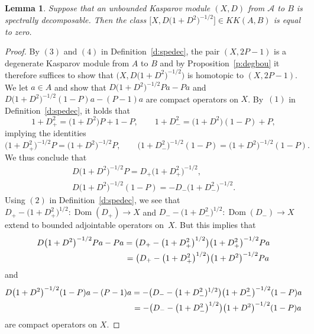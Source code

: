 \documentclass[11pt]{article}
\numberwithin{equation}{section}
\newtheorem{lem}[Theorem]{Lemma}
\newcommand{\s}[1]{\mathscr{#1}}
\begin{document}
\begin{lem}\label{l:spezer}
Suppose that an unbounded Kasparov module $(X,D)$ from $\s A$ to $B$ is spectrally decomposable. Then the class $\big[X,D\big(1 + D^2\big)^{-1/2}\big] \in KK(A,B)$ is equal to zero.
\end{lem}
\begin{proof}By $(3)$ and $(4)$ in Definition~\ref{d:spedec}, the pair $(X, 2 P - 1)$ is a degenerate Kasparov module from $A$ to $B$ and by Proposition~\ref{p:degbou} it therefore suffices to show that $\big(X,D\big(1 + D^2\big)^{-1/2}\big)$ is homotopic to $(X, 2P - 1)$. We let $a \in A$ and show that $D\big(1 + D^2\big)^{-1/2} P a - P a$ and $D\big(1 + D^2\big)^{-1/2}(1 - P) a - (P - 1) a$ are compact operators on $X$. By~$(1)$ in Definition~\ref{d:spedec}, it holds that
\[
1 + D_+^2 = \big(1 + D^2\big) P + 1 - P , \qquad 1 + D_-^2 = \big(1 + D^2\big)(1 - P) + P ,
\]
implying the identities
\[
\big(1 + D_+^2 \big)^{-1/2}P = \big(1 + D^2\big)^{-1/2} P , \qquad \big(1 + D_-^2\big)^{-1/2}(1-P) = \big(1 + D^2\big)^{-1/2} (1 - P) .
\]
We thus conclude that
\begin{gather*}
D\big(1 + D^2\big)^{-1/2} P = D_+ \big(1 + D_+^2\big)^{-1/2} , \\ D \big(1 + D^2\big)^{-1/2} (1 - P) = - D_- \big(1 + D_-^2 \big)^{-1/2} .
\end{gather*}
Using $(2)$ in Definition~\ref{d:spedec}, we see that $D_+ - \big(1 + D_+^2\big)^{1/2}\colon \operatorname{Dom}(D_+) \to X$ and $D_- - \big(1 + D_-^2 \big)^{1/2}\colon \operatorname{Dom}( D_-) \to X$ extend to bounded adjointable operators on~$X$. But this implies that
\begin{gather*}
 D\big(1 + D^2\big)^{-1/2} P a - P a = \big(D_+ - \big(1 + D_+^2\big)^{1/2}\big)\big(1 + D_+^2\big)^{-1/2} P a \\
\hphantom{D\big(1 + D^2\big)^{-1/2} P a - P a}{} = \big(D_+ - \big(1 + D_+^2\big)^{1/2}\big) \big(1 + D^2\big)^{-1/2} P a
\end{gather*}
and
\begin{gather*}
D\big(1 + D^2\big)^{-1/2} (1 - P) a - (P-1) a = - \big(D_- - \big(1 + D_-^2)^{1/2}\big)\big(1 + D_-^2\big)^{-1/2} (1 - P) a \\
\hphantom{D\big(1 + D^2\big)^{-1/2} (1 - P) a - (P-1) a}{} = -\big(D_- - \big(1 + D_-^2\big)^{1/2}\big) \big(1 + D^2\big)^{-1/2} (1 - P) a
\end{gather*}
are compact operators on $X$.
\end{proof}
\end{document}
